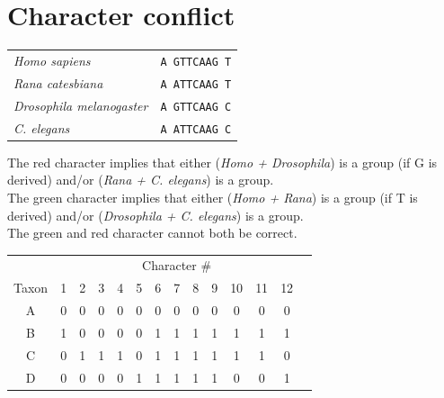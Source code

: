 \documentclass[landscape]{foils}
\begin{document}
\section*{Character conflict}
\begin{table}[htdp]
\begin{center}
\begin{tabular}{l|l}
 &  \\
\hline
{\em Homo sapiens} & {\tt A{\color{red} G}TTCAAG{\color{green} T}} \\
{\em Rana catesbiana}  & {\tt A{\color{red} A}TTCAAG{\color{green} T}} \\
{\em Drosophila melanogaster}  & {\tt A{\color{red} G}TTCAAG{\color{green} C}} \\
{\em C. elegans}  & {\tt A{\color{red} A}TTCAAG{\color{green} C}} \\
\end{tabular}
\end{center}
\label{default}
\end{table}
The red character implies that either ({\em Homo + Drosophila}) is a group (if G is derived) and/or
({\em Rana + C. elegans}) is a group.\\
The green character implies that either ({\em Homo + Rana}) is a group (if T is derived) and/or
({\em Drosophila + C. elegans}) is a group.\\
The green and red character cannot both be correct.


\myNewSlide
\begin{table}[htdp]
\begin{center}
\label{coloredHomoplasy}
\begin{tabular}{|c|c|c|c|c|c|c|c|c|c|c|c|c|c|}
\hline 
 & \multicolumn{12}{c|}{Character \#} \\ 
Taxon &\color{blue} 1 & \color{blue} 2 & \color{blue} 3 & \color{blue} 4 & \color{blue} 5 & \color{green} 6 & \color{green} 7 & \color{green} 8 & \color{green} 9 & \color{red} 10 & \color{red} 11 &  \color{red} 12   \\ 
\hline 
A & \color{blue} 0 & \color{blue} 0 & \color{blue} 0 & \color{blue} 0 & \color{blue} 0 & \color{green} 0 & \color{green} 0 & \color{green} 0 & \color{green} 0 & \color{red} 0 & \color{red} 0 & \color{red} 0  \\
B & \color{blue} 1 & \color{blue} 0 & \color{blue} 0 & \color{blue} 0 & \color{blue} 0 & \color{green} 1 & \color{green} 1 & \color{green} 1 & \color{green} 1 & \color{red} 1 & \color{red} 1 & \color{red} 1 \\
C &    \color{blue} 0 & \color{blue} 1 & \color{blue} 1 & \color{blue} 1 & \color{blue} 0 & \color{green} 1 & \color{green} 1 & \color{green} 1 & \color{green} 1 & \color{red} 1 & \color{red} 1 & \color{red} 0\\
D &    \color{blue} 0 & \color{blue} 0 & \color{blue} 0 & \color{blue} 0 & \color{blue} 1 & \color{green} 1 & \color{green} 1 & \color{green} 1 & \color{green} 1 & \color{red} 0 & \color{red} 0 & \color{red} 1\\
\hline 
\end{tabular}
\end{center}
\end{table}
\end{document}
